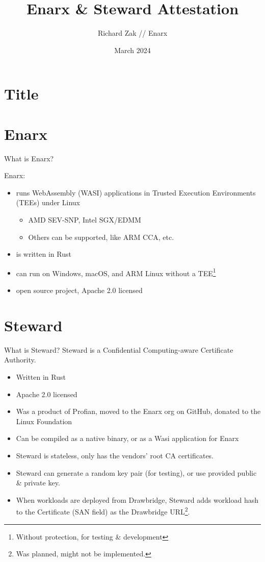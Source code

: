 \documentclass[graphics]{beamer}
\title{Enarx \& Steward Attestation}
\author{Richard Zak // Enarx}
\date{March 2024}
\begin{document}
\section*{Title}
\begin{frame}
\maketitle
\end{frame}

\frame{\tableofcontents}

\section{Enarx}
\begin{frame}{What is Enarx?}

Enarx:
\begin{itemize}
\item runs WebAssembly (WASI) applications in Trusted Execution Environments (TEEs) under Linux
\begin{itemize}
\item AMD SEV-SNP, Intel SGX/EDMM
\item Others can be supported, like ARM CCA, etc.
\end{itemize}
\item is written in Rust
\item can run on Windows, macOS, and ARM Linux without a TEE\footnote{Without protection, for testing \& development}
\item open source project, Apache 2.0 licensed
\end{itemize}

\end{frame}

\section{Steward}
\begin{frame}{What is Steward?}
Steward is a Confidential Computing-aware Certificate Authority.
\begin{itemize}
    \item Written in Rust
    \item Apache 2.0 licensed
    \item Was a product of Profian, moved to the Enarx org on GitHub, donated to the Linux Foundation
    \item Can be compiled as a native binary, or as a Wasi application for Enarx
    \item Steward is stateless, only has the vendors' root CA certificates.
    \item Steward can generate a random key pair (for testing), or use provided public \& private key.
    \item When workloads are deployed from Drawbridge, Steward adds workload hash to the Certificate (SAN field) as the Drawbridge URL\footnote{Was planned, might not be implemented.}.
\end{itemize}
\end{frame}
\end{document}
